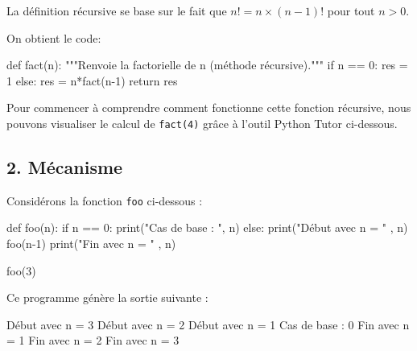 \documentclass[
  a4paper,
  DIV=11,
  numbers=noendperiod]{scrartcl}
\newenvironment{Shaded}{\begin{snugshade}}{\end{snugshade}}
\newcommand{\BuiltInTok}[1]{\textcolor[rgb]{0.00,0.23,0.31}{#1}}
\newcommand{\CommentTok}[1]{\textcolor[rgb]{0.37,0.37,0.37}{#1}}
\newcommand{\ControlFlowTok}[1]{\textcolor[rgb]{0.00,0.23,0.31}{#1}}
\newcommand{\DecValTok}[1]{\textcolor[rgb]{0.68,0.00,0.00}{#1}}
\newcommand{\KeywordTok}[1]{\textcolor[rgb]{0.00,0.23,0.31}{#1}}
\newcommand{\NormalTok}[1]{\textcolor[rgb]{0.00,0.23,0.31}{#1}}
\newcommand{\OperatorTok}[1]{\textcolor[rgb]{0.37,0.37,0.37}{#1}}
\newcommand{\StringTok}[1]{\textcolor[rgb]{0.13,0.47,0.30}{#1}}
\begin{document}
La définition récursive se base sur le fait que \(n! = n\times (n-1)!\)
pour tout \(n>0\).

On obtient le code:

\begin{Shaded}
\begin{Highlighting}[]
  \KeywordTok{def}\NormalTok{ fact(n):}
    \CommentTok{"""Renvoie la factorielle de n (méthode récursive)."""}
    \ControlFlowTok{if}\NormalTok{ n }\OperatorTok{==} \DecValTok{0}\NormalTok{:}
\NormalTok{      res }\OperatorTok{=} \DecValTok{1}
    \ControlFlowTok{else}\NormalTok{:}
\NormalTok{      res }\OperatorTok{=}\NormalTok{ n}\OperatorTok{*}\NormalTok{fact(n}\OperatorTok{{-}}\DecValTok{1}\NormalTok{)}
    \ControlFlowTok{return}\NormalTok{ res}
\end{Highlighting}
\end{Shaded}

Pour commencer à comprendre comment fonctionne cette fonction récursive,
nous pouvons visualiser le calcul de \texttt{fact(4)} grâce à l'outil
Python Tutor ci-dessous.

\hypertarget{muxe9canisme}{%
\subsection{2. Mécanisme}\label{muxe9canisme}}

Considérons la fonction \texttt{foo} ci-dessous :

\begin{Shaded}
\begin{Highlighting}[]
\KeywordTok{def}\NormalTok{ foo(n):}
    \ControlFlowTok{if}\NormalTok{ n }\OperatorTok{==} \DecValTok{0}\NormalTok{:}
        \BuiltInTok{print}\NormalTok{(}\StringTok{"Cas de base : "}\NormalTok{, n)}
    \ControlFlowTok{else}\NormalTok{:}
        \BuiltInTok{print}\NormalTok{(}\StringTok{"Début avec n = "}\NormalTok{ , n)}
\NormalTok{        foo(n}\OperatorTok{{-}}\DecValTok{1}\NormalTok{)}
        \BuiltInTok{print}\NormalTok{(}\StringTok{"Fin avec n = "}\NormalTok{ , n)}


\NormalTok{foo(}\DecValTok{3}\NormalTok{)}
\end{Highlighting}
\end{Shaded}

Ce programme génère la sortie suivante :

\begin{Shaded}
\begin{Highlighting}[]
\NormalTok{Début avec n =  3}
\NormalTok{Début avec n =  2}
\NormalTok{Début avec n =  1}
\NormalTok{Cas de base :  0}
\NormalTok{Fin avec n =  1}
\NormalTok{Fin avec n =  2}
\NormalTok{Fin avec n =  3}
\end{Highlighting}
\end{Shaded}
\end{document}
